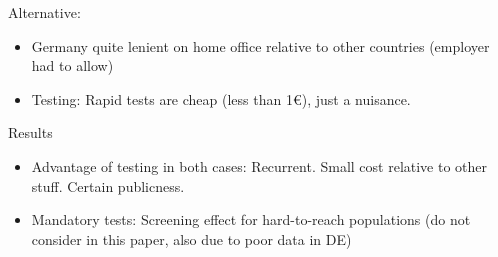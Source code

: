 Alternative:
\begin{itemize}
    \item Germany quite lenient on home office relative to other countries (employer had
          to allow)
    \item Testing: Rapid tests are cheap (less than 1\euro), just a nuisance.
\end{itemize}

Results
\begin{itemize}
    \item Advantage of testing in both cases: Recurrent. Small cost relative to other
          stuff. Certain publicness.
    \item Mandatory tests: Screening effect for hard-to-reach populations (do not
          consider in this paper, also due to poor data in DE)
\end{itemize}
